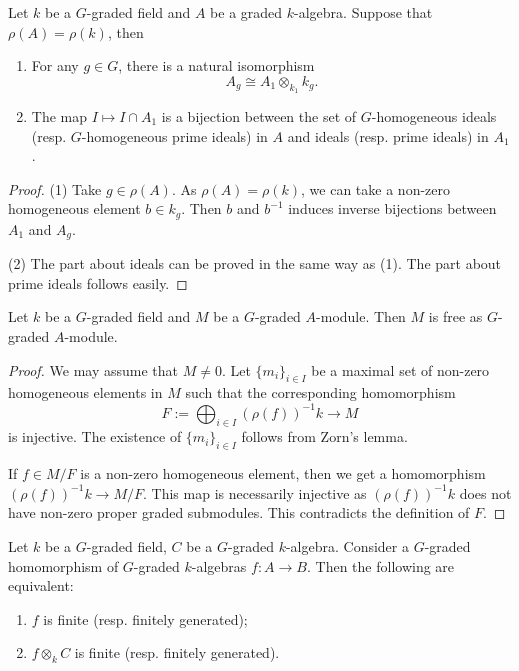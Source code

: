 \begin{lemma}
    Let $k$ be a $G$-graded field and $A$ be a graded $k$-algebra. Suppose that $\rho(A)=\rho(k)$, then
    \begin{enumerate}
        \item For any $g\in G$, there is a natural isomorphism
            \[
                A_g\cong A_1 \otimes_{k_1} k_g.
            \]
        \item The map $I\mapsto I\cap A_1$ is a bijection between the set of $G$-homogeneous ideals (resp. $G$-homogeneous prime ideals) in $A$ and ideals (resp. prime ideals) in $A_1$.
    \end{enumerate}
\end{lemma}
\begin{proof}
    (1) Take $g\in \rho(A)$. As $\rho(A)=\rho(k)$, we can take a non-zero homogeneous element $b\in k_g$. Then $b$ and $b^{-1}$ induces inverse bijections between $A_1$ and $A_g$.

    (2) The part about ideals can be proved in the same way as (1). The part about prime ideals follows easily.
\end{proof}

\begin{proposition}\label{prop-gradedmoduleofgradedringfree}
    Let $k$ be a $G$-graded field and $M$ be a $G$-graded $A$-module. Then $M$ is free as $G$-graded $A$-module.
\end{proposition}
\begin{proof}
    We may assume that $M\neq 0$.
    Let $\{m_i\}_{i\in I}$ be a maximal set of non-zero homogeneous elements in $M$ such that the corresponding homomorphism 
    \[
        F:=\bigoplus_{i\in I} (\rho(f))^{-1}k\rightarrow M  
    \] 
    is injective. The existence of $\{m_i\}_{i\in I}$ follows from Zorn's lemma.

    If $f\in M/F$ is a non-zero homogeneous element, then we get a homomorphism $(\rho(f))^{-1}k\rightarrow M/F$. This map is necessarily injective as $(\rho(f))^{-1}k$ does not have non-zero proper graded submodules. This contradicts the definition of $F$.
\end{proof}

\begin{corollary}\label{cor-finitegradeddescent}
    Let $k$ be a $G$-graded field, $C$ be a $G$-graded $k$-algebra. Consider a $G$-graded homomorphism of $G$-graded $k$-algebras $f:A\rightarrow B$. Then the following are equivalent:
    \begin{enumerate}
        \item $f$ is finite (resp. finitely generated);
        \item $f\otimes_k C$ is finite (resp. finitely generated).
    \end{enumerate}
\end{corollary}

